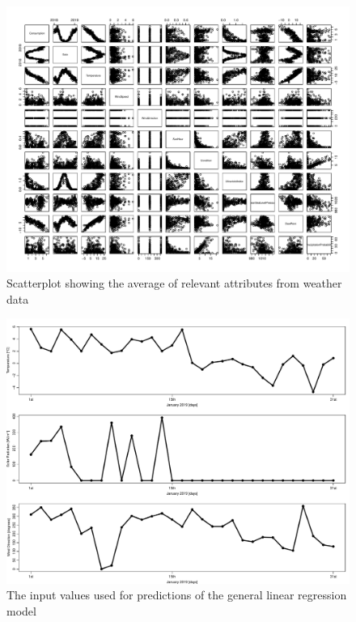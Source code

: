\begin{figure}
    \centering
    \includegraphics[width=1.3\textwidth, angle = 90]{../../../figures/weather_cons.pdf}
    \caption{Scatterplot showing the average of relevant attributes from weather data}
    \label{fig: weather_cons}
\end{figure}

\begin{figure}
    \centering
    \includegraphics[width=1.\textwidth]{../../../figures/weather_pred.pdf}
    \caption{The input values used for predictions of the general linear regression model}
    \label{fig: weather_pred}
\end{figure}

